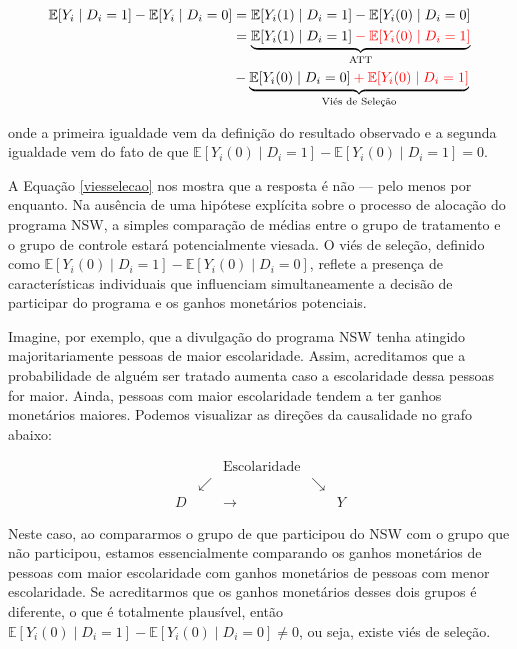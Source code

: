 \begin{equation}\label{viesselecao}
    \begin{split}
        \mathbb{E}[Y_i \mid D_i = 1] - \mathbb{E}[Y_i \mid D_i = 0] & = \mathbb{E}[Y_i(1) \mid D_i = 1] - \mathbb{E}[Y_i(0) \mid D_i = 0]\\
        & = \underbrace{\mathbb{E}[Y_i(1) \mid D_i = 1] \color{red} -\mathbb{E}[Y_i(0) \mid D_i = 1]\color{black}}_{\text{ATT}} \\
        & - \underbrace{\mathbb{E}[Y_i(0) \mid D_i = 0] \color{red} + \mathbb{E}[Y_i(0) \mid D_i = 1] \color{black}}_{\text{Viés de Seleção}}
    \end{split}
\end{equation}

\noindent onde a primeira igualdade vem da definição do resultado observado e a segunda igualdade vem do fato de que $\mathbb{E}[Y_i(0) \mid D_i = 1] - \mathbb{E}[Y_i(0) \mid D_i = 1] = 0$. 

A Equação \eqref{viesselecao} nos mostra que a resposta é não — pelo menos por enquanto. Na ausência de uma hipótese explícita sobre o processo de alocação do programa NSW, a simples comparação de médias entre o grupo de tratamento e o grupo de controle estará potencialmente viesada. O viés de seleção, definido como $\mathbb{E}[Y_i(0) \mid D_i = 1] - \mathbb{E}[Y_i(0) \mid D_i = 0]$, reflete a presença de características individuais que influenciam simultaneamente a decisão de participar do programa e os ganhos monetários potenciais.


Imagine, por exemplo, que a divulgação do programa NSW tenha atingido majoritariamente pessoas de maior escolaridade. Assim, acreditamos que a probabilidade de alguém ser tratado aumenta caso a escolaridade dessa pessoas for maior. Ainda, pessoas com maior escolaridade tendem a ter ganhos monetários maiores. Podemos visualizar as direções da causalidade no grafo abaixo:

\[
\begin{array}{ccccc}
  & & \text{Escolaridade} & & \\
  & \swarrow & & \searrow \\
  D & &\longrightarrow && Y
\end{array}
\]

Neste caso, ao compararmos o grupo de que participou do NSW com o grupo que não participou, estamos essencialmente comparando os ganhos monetários de pessoas com maior escolaridade com ganhos monetários de pessoas com menor escolaridade. Se acreditarmos que os ganhos monetários desses dois grupos é diferente, o que é totalmente plausível, então $\mathbb{E}[Y_i(0) \mid D_i = 1] - \mathbb{E}[Y_i(0) \mid D_i = 0] \neq 0$, ou seja, existe viés de seleção.

